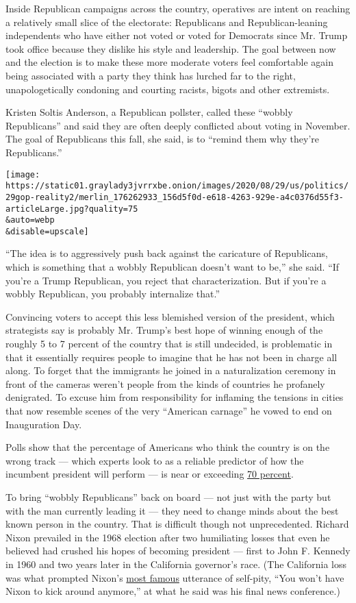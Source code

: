 Inside Republican campaigns across the country, operatives are intent on
reaching a relatively small slice of the electorate: Republicans and
Republican-leaning independents who have either not voted or voted for
Democrats since Mr. Trump took office because they dislike his style and
leadership. The goal between now and the election is to make these more
moderate voters feel comfortable again being associated with a party
they think has lurched far to the right, unapologetically condoning and
courting racists, bigots and other extremists.

Kristen Soltis Anderson, a Republican pollster, called these ``wobbly
Republicans'' and said they are often deeply conflicted about voting in
November. The goal of Republicans this fall, she said, is to ``remind
them why they're Republicans.''

\texttt{[image: https://static01.graylady3jvrrxbe.onion/images/2020/08/29/us/politics/29gop-reality2/merlin\_176262933\_156d5f0d-e618-4263-929e-a4c0376d55f3-articleLarge.jpg?quality=75\\\&auto=webp\\\&disable=upscale]}

``The idea is to aggressively push back against the caricature of
Republicans, which is something that a wobbly Republican doesn't want to
be,'' she said. ``If you're a Trump Republican, you reject that
characterization. But if you're a wobbly Republican, you probably
internalize that.''

Convincing voters to accept this less blemished version of the
president, which strategists say is probably Mr. Trump's best hope of
winning enough of the roughly 5 to 7 percent of the country that is
still undecided, is problematic in that it essentially requires people
to imagine that he has not been in charge all along. To forget that the
immigrants he joined in a naturalization ceremony in front of the
cameras weren't people from the kinds of countries he profanely
denigrated. To excuse him from responsibility for inflaming the tensions
in cities that now resemble scenes of the very ``American carnage'' he
vowed to end on Inauguration Day.

Polls show that the percentage of Americans who think the country is on
the wrong track --- which experts look to as a reliable predictor of how
the incumbent president will perform --- is near or exceeding
\href{https://cookpolitical.com/index.php/analysis/national/national-politics/right-direction-and-wrong-track-numbers-tell-story-election}{70
percent}.

To bring ``wobbly Republicans'' back on board --- not just with the
party but with the man currently leading it --- they need to change
minds about the best known person in the country. That is difficult
though not unprecedented. Richard Nixon prevailed in the 1968 election
after two humiliating losses that even he believed had crushed his hopes
of becoming president --- first to John F. Kennedy in 1960 and two years
later in the California governor's race. (The California loss was what
prompted Nixon's
\href{https://www.nixonfoundation.org/2017/11/55-years-ago-last-press-conference/}{most
famous} utterance of self-pity, ``You won't have Nixon to kick around
anymore,'' at what he said was his final news conference.)

